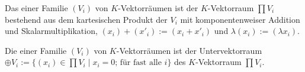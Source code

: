 \begin{definition}
	Das  einer Familie $(V_i)$ von $K$-Vektorräumen ist der $K$-Vektorraum 
	$\prod V_i$ bestehend aus dem kartesischen Produkt der $V_i$ mit komponentenweiser Addition und 
	Skalarmultiplikation, $(x_i)+(x'_i) := (x_i+x'_i)$ und $\lambda(x_i) := (\lambda x_i).$
\end{definition}

\begin{definition}
	Die  einer Familie $(V_i)$ von $K$-Vektorräumen ist der Untervektorraum 
	$\oplus V_i := \{(x_i) \in \prod V_i \mid x_i=0 \text{; für fast alle }i\}$ des $K$-Vektorraum $\prod V_i$.
\end{definition}